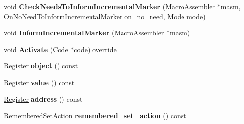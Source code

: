 \begin{DoxyCompactItemize}
\item 
void {\bfseries Check\+Needs\+To\+Inform\+Incremental\+Marker} (\hyperlink{classv8_1_1internal_1_1_macro_assembler}{Macro\+Assembler} $\ast$masm, On\+No\+Need\+To\+Inform\+Incremental\+Marker on\+\_\+no\+\_\+need, Mode mode)\hypertarget{classv8_1_1internal_1_1_record_write_stub_aa80cd82bd6fa0cdc17b5cb2d17540d59}{}\label{classv8_1_1internal_1_1_record_write_stub_aa80cd82bd6fa0cdc17b5cb2d17540d59}

\item 
void {\bfseries Inform\+Incremental\+Marker} (\hyperlink{classv8_1_1internal_1_1_macro_assembler}{Macro\+Assembler} $\ast$masm)\hypertarget{classv8_1_1internal_1_1_record_write_stub_a18e17a353df1617947581e3e6b9e9183}{}\label{classv8_1_1internal_1_1_record_write_stub_a18e17a353df1617947581e3e6b9e9183}

\item 
void {\bfseries Activate} (\hyperlink{classv8_1_1internal_1_1_code}{Code} $\ast$code) override\hypertarget{classv8_1_1internal_1_1_record_write_stub_aee832e64590d152a601ed41c5e4fdac9}{}\label{classv8_1_1internal_1_1_record_write_stub_aee832e64590d152a601ed41c5e4fdac9}

\item 
\hyperlink{structv8_1_1internal_1_1_register}{Register} {\bfseries object} () const \hypertarget{classv8_1_1internal_1_1_record_write_stub_a6d3a7affc9526b332c46fbe8f54f0b19}{}\label{classv8_1_1internal_1_1_record_write_stub_a6d3a7affc9526b332c46fbe8f54f0b19}

\item 
\hyperlink{structv8_1_1internal_1_1_register}{Register} {\bfseries value} () const \hypertarget{classv8_1_1internal_1_1_record_write_stub_a7c90bc874fcf5f031f8b923b09dee7ad}{}\label{classv8_1_1internal_1_1_record_write_stub_a7c90bc874fcf5f031f8b923b09dee7ad}

\item 
\hyperlink{structv8_1_1internal_1_1_register}{Register} {\bfseries address} () const \hypertarget{classv8_1_1internal_1_1_record_write_stub_a3735e76e5fcb078fcd9f08c519c94d8c}{}\label{classv8_1_1internal_1_1_record_write_stub_a3735e76e5fcb078fcd9f08c519c94d8c}

\item 
Remembered\+Set\+Action {\bfseries remembered\+\_\+set\+\_\+action} () const \hypertarget{classv8_1_1internal_1_1_record_write_stub_ab333b01d325ff4e597af83c7f93bc109}{}\label{classv8_1_1internal_1_1_record_write_stub_ab333b01d325ff4e597af83c7f93bc109}


\end{DoxyCompactItemize}

